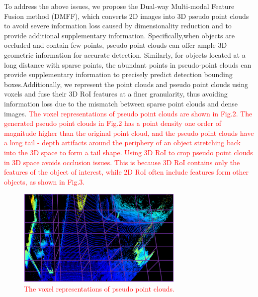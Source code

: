 \begin{sloppypar}
To address the above issues, we propose the Dual-way Multi-modal Feature Fusion method (DMFF), which converts 2D images into 3D pseudo point clouds to avoid severe information loss caused by dimensionality reduction and to provide additional supplementary information. Specifically,when objects are occluded and contain few points, pseudo point clouds can offer ample 3D geometric information for accurate detection. Similarly, for objects located at a long distance with sparse points, the abundant points in pseudo-point clouds can provide supplementary information to precisely predict detection bounding boxes.Additionally, we represent the point clouds and pseudo point clouds using voxels and fuse their 3D RoI features at a finer granularity, thus avoiding information loss due to the mismatch between sparse point clouds and dense images. \textcolor{red}{The voxel representations of pseudo point clouds are shown in Fig.2. The generated pseudo point clouds in Fig.2 has a point density one order of magnitude higher than the original point cloud, and the pseudo point clouds have a long tail - depth artifacts around the periphery of an object stretching back into the 3D space to form a tail shape.} \textcolor{red}{
Using 3D RoI to crop pseudo point clouds in 3D space avoids occlusion issues. This is because 3D RoI contains only the features of the object of interest, while 2D RoI often include features form other objects, as shown in Fig.3.
}

\begin{figure}[h]
\centering
\includegraphics[width=8cm]{new_images1/fig2.png}
\caption{\textcolor{red}{The voxel representations of pseudo point clouds.}} 
\label{fig_sim}
\end{figure}


\end{sloppypar}
